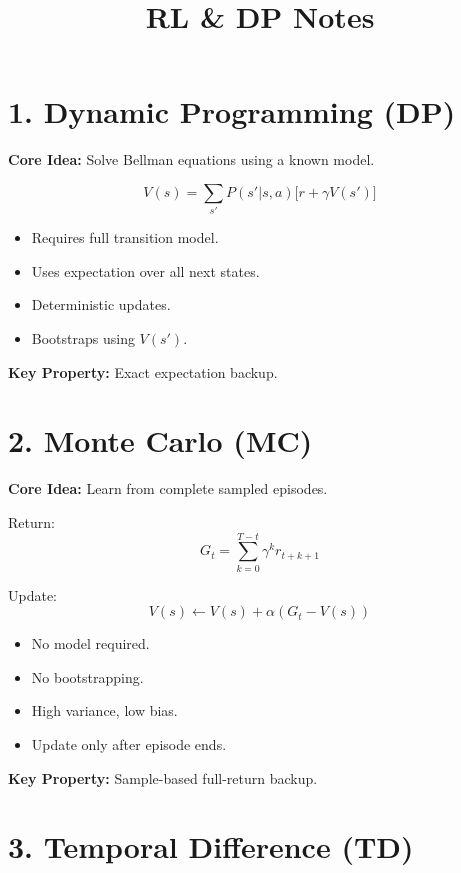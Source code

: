 \documentclass[11pt]{article}
\title{RL \& DP Notes}
\author{}
\date{}
\begin{document}
\maketitle

\section*{1. Dynamic Programming (DP)}

\textbf{Core Idea:} Solve Bellman equations using a known model.

\[
V(s) = \sum_{s'} P(s'|s,a)\big[r + \gamma V(s')\big]
\]

\begin{itemize}
\item Requires full transition model.
\item Uses expectation over all next states.
\item Deterministic updates.
\item Bootstraps using $V(s')$.
\end{itemize}

\textbf{Key Property:} Exact expectation backup.

\vspace{1em}

\section*{2. Monte Carlo (MC)}

\textbf{Core Idea:} Learn from complete sampled episodes.

Return:
\[
G_t = \sum_{k=0}^{T-t} \gamma^k r_{t+k+1}
\]

Update:
\[
V(s) \leftarrow V(s) + \alpha (G_t - V(s))
\]

\begin{itemize}
\item No model required.
\item No bootstrapping.
\item High variance, low bias.
\item Update only after episode ends.
\end{itemize}

\textbf{Key Property:} Sample-based full-return backup.

\vspace{1em}

\section*{3. Temporal Difference (TD)}
\end{document}
